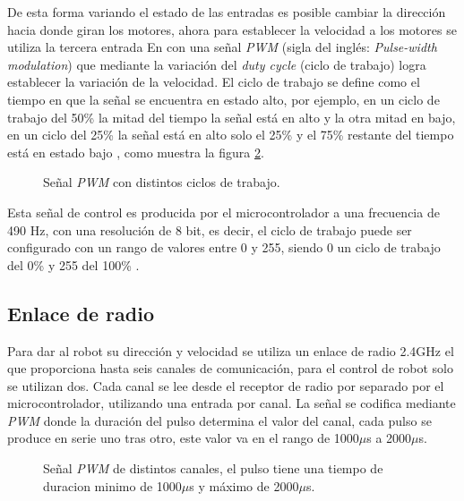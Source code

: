 \documentclass{iccmemoria}
\begin{document}
De esta forma variando el estado de las entradas es posible cambiar la dirección hacia donde giran los motores, ahora para establecer la velocidad a los motores se utiliza la tercera entrada En con una señal \emph{PWM} (sigla del inglés: \emph{Pulse-width modulation}) que mediante la variación del \emph{duty cycle} (ciclo de trabajo) logra establecer la variación de la velocidad. El ciclo de trabajo se define como el tiempo en que la señal se encuentra en estado alto, por ejemplo, en un ciclo de trabajo del 50\% la mitad del tiempo la señal está en alto y la otra mitad en bajo, en un ciclo del 25\% la señal está en alto solo el 25\% y el 75\% restante del tiempo está en estado bajo \cite{barrett2006microcontrollers}, como muestra la figura \ref{fig:pwm}.\\

\begin{figure}[H]
  \centering
  \selectfont{
  
  }
  \caption[Ciclo de trabajo de señal \emph{PWM}]{Señal \emph{PWM} con distintos ciclos de trabajo.}
  \label{fig:pwm}
\end{figure}
 
Esta señal de control es producida por el microcontrolador a una frecuencia de 490 Hz, con una resolución de 8 bit, es decir, el ciclo de trabajo puede ser configurado con un rango de valores entre 0 y 255, siendo 0 un ciclo de trabajo del 0\% y 255 del 100\% \cite{referenceAnalogWrite}.\\

\subsection{Enlace de radio}

Para dar al robot su dirección y velocidad se utiliza un enlace de radio 2.4GHz el que proporciona hasta seis canales de comunicación, para el control de robot solo se utilizan dos. Cada canal se lee desde el receptor de radio por separado por el microcontrolador, utilizando una entrada por canal. La señal se codifica mediante \emph{PWM} donde la duración del pulso determina el valor del canal, cada pulso se produce en serie uno tras otro, este valor va en el rango de 1000$\mu$s a 2000$\mu$s.\\

\begin{figure}[H]
  \centering
  \selectfont{
  
  }
  \caption[Señal \emph{PWM} de los canales de radio.]{Señal \emph{PWM} de distintos canales, el pulso tiene una tiempo de duracion minimo de 1000$\mu$s y máximo de 2000$\mu$s.}
  \label{fig:pwm}
\end{figure}
\end{document}
